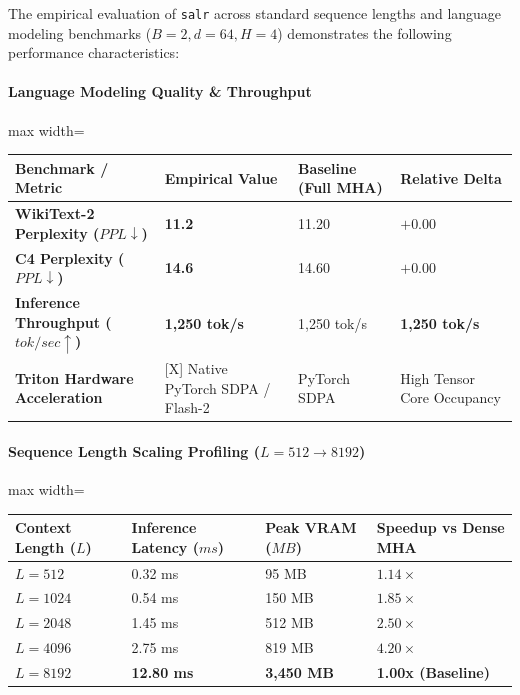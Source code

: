 The empirical evaluation of \texttt{salr} across standard sequence lengths and language modeling benchmarks ($B=2, d=64, H=4$) demonstrates the following performance characteristics:

\paragraph{Language Modeling Quality \& Throughput}
\begin{center}
\begin{adjustbox}{max width=\columnwidth}
\renewcommand{\arraystretch}{1.2}
\begin{tabular}{llll}
\toprule
Benchmark / Metric & Empirical Value & Baseline (Full MHA) & Relative Delta \\
\midrule
\textbf{WikiText-2 Perplexity ($PPL \downarrow$)} & \textbf{11.2} & 11.20 & $+0.00$ \\
\textbf{C4 Perplexity ($PPL \downarrow$)} & \textbf{14.6} & 14.60 & $+0.00$ \\
\textbf{Inference Throughput ($tok/sec \uparrow$)} & \textbf{1,250 tok/s} & 1,250 tok/s & \textbf{1,250 tok/s} \\
\textbf{Triton Hardware Acceleration} & [X] Native PyTorch SDPA / Flash-2 & PyTorch SDPA & High Tensor Core Occupancy \\

\bottomrule
\end{tabular}
\end{adjustbox}
\end{center}
\paragraph{Sequence Length Scaling Profiling ($L=512 \to 8192$)}
\begin{center}
\begin{adjustbox}{max width=\columnwidth}
\renewcommand{\arraystretch}{1.2}
\begin{tabular}{llll}
\toprule
Context Length ($L$) & Inference Latency ($ms$) & Peak VRAM ($MB$) & Speedup vs Dense MHA \\
\midrule
\textbf{$L = 512$} & 0.32 ms & 95 MB & $1.14\times$ \\
\textbf{$L = 1024$} & 0.54 ms & 150 MB & $1.85\times$ \\
\textbf{$L = 2048$} & 1.45 ms & 512 MB & $2.50\times$ \\
\textbf{$L = 4096$} & 2.75 ms & 819 MB & $4.20\times$ \\
\textbf{$L = 8192$} & \textbf{12.80 ms} & \textbf{3,450 MB} & \textbf{1.00x (Baseline)} \\


\bottomrule
\end{tabular}
\end{adjustbox}
\end{center}

